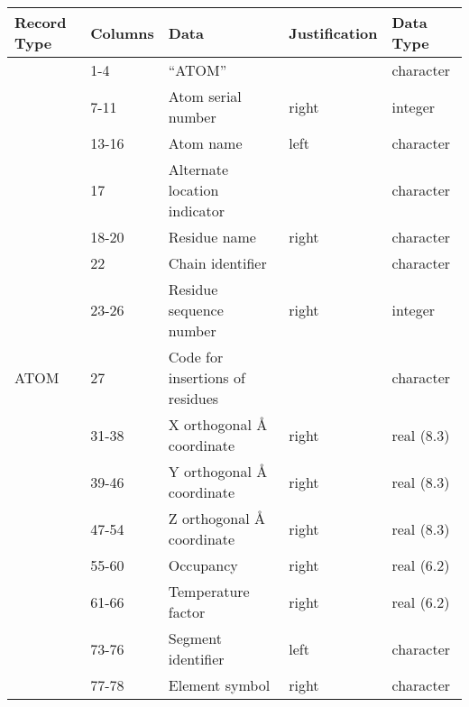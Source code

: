 \begin{table}[!t]
\begin{tabular}{|l|l|l|l|l|}
\hline
Record Type             & Columns & Data                            & Justification & Data Type  \\ \hline
\multirow{15}{*}{ATOM}  & 1-4   & “ATOM”                          &               & character  \\ \cline{2-5} 
                        & 7-11  & Atom serial number              & right         & integer    \\ \cline{2-5} 
                        & 13-16   & Atom name                       & left         & character  \\ \cline{2-5} 
                        & 17      & Alternate location indicator    &               & character  \\ \cline{2-5} 
                        & 18-20  & Residue name                    & right         & character  \\ \cline{2-5} 
                        & 22      & Chain identifier                &               & character  \\ \cline{2-5} 
                        & 23-26   & Residue sequence number         & right         & integer    \\ \cline{2-5} 
                        & 27      & Code for insertions of residues &               & character  \\ \cline{2-5} 
                        & 31-38   & X orthogonal Å coordinate       & right         & real (8.3) \\ \cline{2-5} 
                        & 39-46   & Y orthogonal Å coordinate       & right         & real (8.3) \\ \cline{2-5} 
                        & 47-54   & Z orthogonal Å coordinate       & right         & real (8.3) \\ \cline{2-5} 
                        & 55-60   & Occupancy                       & right         & real (6.2) \\ \cline{2-5} 
                        & 61-66   & Temperature factor              & right         & real (6.2) \\ \cline{2-5} 
                        & 73-76   & Segment identifier              & left          & character  \\ \cline{2-5} 
                        & 77-78   & Element symbol                  & right         & character  \\ \hline

\end{tabular}
\end{table}
